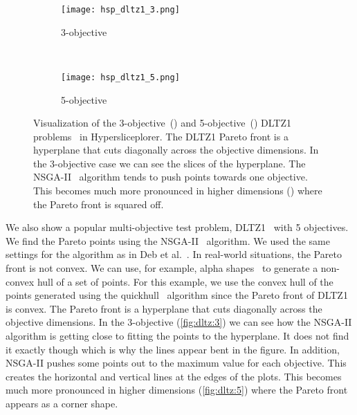 \begin{figure} 
  \centering
  \begin{subfigure}[b]{0.45\linewidth}
    \texttt{[image: hsp\_dltz1\_3.png]}
    \caption{3-objective}
    \label{fig:dltz:3}
  \end{subfigure}
  ~
  \begin{subfigure}[b]{0.45\linewidth}
    \texttt{[image: hsp\_dltz1\_5.png]}
    \caption{5-objective}
    \label{fig:dltz:5}
  \end{subfigure}
  \caption{%
    Visualization of the 3-objective~() and 
    5-objective~() DLTZ1 problems~\cite{Deb:2002a} in
    Hypersliceplorer. The DLTZ1 Pareto front is a hyperplane that cuts 
    diagonally across the objective dimensions. In the 3-objective case we 
    can see the slices of the hyperplane. The NSGA-II~\cite{Deb:2002} 
    algorithm tends to push points towards one objective. This becomes much
    more pronounced in higher dimensions () where the
    Pareto front is squared off.
  }
  \label{fig:dltz} 
\end{figure}

We also show a popular multi-objective test problem, DLTZ1~\cite{Deb:2002a}
with 5 objectives.  We find the Pareto points using the NSGA-II~\cite{Deb:2002}
algorithm.  We used the same settings for the algorithm as in Deb et 
al.~\cite{Deb:2002a}.  In real-world situations, the Pareto front is not
convex. We can use, for example, alpha shapes~\cite{Edelsbrunner:1983} to
generate a non-convex hull of a set of points. For this example, we use the
convex hull of the points generated using the quickhull~\cite{Barber:1996}
algorithm since the Pareto front of DLTZ1 is convex.  The Pareto front is a
hyperplane that cuts diagonally across the objective dimensions. In the
3-objective (\autoref{fig:dltz:3}) we can see how the NSGA-II algorithm is 
getting close to fitting the points to the hyperplane. It does not find it
exactly though which is why the lines appear bent in the figure. In addition,
NSGA-II pushes some points out to the maximum value for each objective.
This creates the horizontal and vertical lines at the edges of the plots.
This becomes much more pronounced in higher dimensions (\autoref{fig:dltz:5})
where the Pareto front appears as a corner shape.

